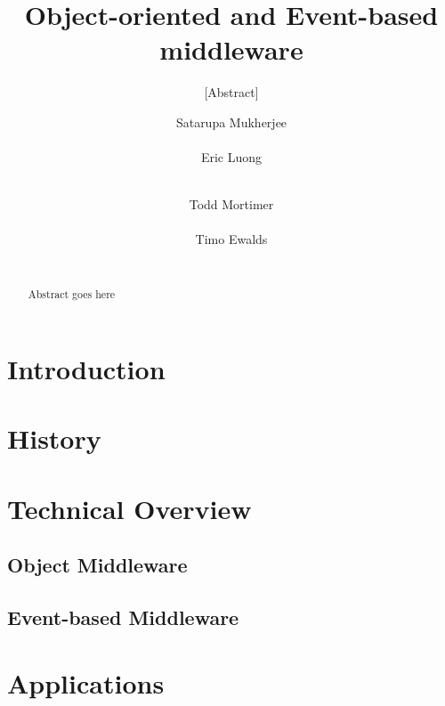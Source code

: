 \documentclass{acm_proc_article-sp}
\begin{document}
\title{Object-oriented and Event-based middleware}
\subtitle{[Abstract]}


\author{
\alignauthor
Satarupa Mukherjee \\
       \\
\alignauthor
Eric Luong \\
       \\
\and  
\alignauthor 
Todd Mortimer \\
       \\
\alignauthor 
Timo Ewalds\\
      \\
}


\maketitle
\begin{abstract}
Abstract goes here
\end{abstract}


\section{Introduction}


\section{History}

\section{Technical Overview}

\subsection{Object Middleware}

\subsection{Event-based Middleware}

\section{Applications}
\end{document}
